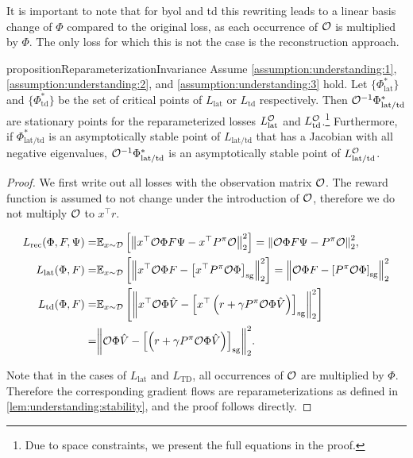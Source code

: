 It is important to note that for \ac{byol} and \ac{td} this rewriting leads to a linear basis change of $\Phi$ compared to the original loss, as each occurrence of ${\mathcal{O}}$ is multiplied by $\Phi$. The only loss for which this is not the case is the reconstruction approach.

\begin{restatable}{proposition}{ReparameterizationInvariance} 
Assume \autoref{assumption:understanding:1}, \autoref{assumption:understanding:2}, and \autoref{assumption:understanding:3} hold. Let $\{\Phi^*_\mathrm{lat}\}$ and ${\{\Phi^*_\mathrm{td}\}}$ be the set of critical points of $L_\mathrm{lat}$ or $L_\mathrm{td}$ respectively.
Then ${\mathcal{O}}^{-1}\Phi^*_\mathrm{lat/td}$ are stationary points for the reparameterized losses $L_\mathrm{lat}^{\mathcal{O}}$ and $L_\mathrm{td}^{\mathcal{O}}$.\footnote{Due to space constraints, we present the full equations in the proof.} Furthermore, if $\Phi^*_\mathrm{lat/td}$ is an asymptotically stable point of $L_\mathrm{lat/td}$ that has a Jacobian with all negative eigenvalues, ${\mathcal{O}}^{-1}\Phi^*_\mathrm{lat/td}$ is an asymptotically stable point of $L_\mathrm{lat/td}^{\mathcal{O}}$.
\end{restatable}
\begin{proof}
We first write out all losses with the observation matrix ${\mathcal{O}}$. The reward function is assumed to not change under the introduction of ${\mathcal{O}}$, therefore we do not multiply ${\mathcal{O}}$ to $x^\top r$.

\begin{align*}
    L_{\text{rec}}(\Phi,F,\Psi) =& \mathbb{E}_{x \sim \mathcal{D}}\left[  \left\lVert x^\top {\mathcal{O}} \Phi F \Psi - x^\top {P^\pi}{\mathcal{O}} \right\rVert_2^2 \right] = {\left\lVert {\mathcal{O}} \Phi F \Psi - {P^\pi}{\mathcal{O}} \right\rVert_2^2}, \\
    L_{\text{lat}}(\Phi,F) =& \mathbb{E}_{x \sim \mathcal{D}}\left[  \left\lVert x^\top {\mathcal{O}} \Phi F - \left[x^\top {P^\pi} {\mathcal{O}} \Phi\right]_{\mathrm{sg}} \right\rVert_2^2 \right] = \left\lVert {\mathcal{O}} \Phi F - \left[{P^\pi} {\mathcal{O}} \Phi\right]_{\mathrm{sg}} \right\rVert_2^2 \\
    L_{\text{td}}(\Phi,F) =& \mathbb{E}_{x \sim \mathcal{D}}\left[  \left\lVert x^\top{\mathcal{O}}\Phi \hat{V} - \left[x^\top \left(r + \gamma P^\pi {\mathcal{O}}\Phi \hat{V}\right)\right]_{\mathrm{sg}} \right\rVert_2^2 \right] \\=& {\left\lVert {\mathcal{O}}\Phi \hat{V} - \left[\left(r + \gamma P^\pi {\mathcal{O}}\Phi \hat{V}\right)\right]_{\mathrm{sg}} \right\rVert_2^2}.
\end{align*}

Note that in the cases of $L_{\text{lat}}$ and $L_\text{TD}$, all occurrences of ${\mathcal{O}}$ are multiplied by $\Phi$.
Therefore the corresponding gradient flows are reparameterizations as defined in \autoref{lem:understanding:stability}, and the proof follows directly.
\end{proof}

